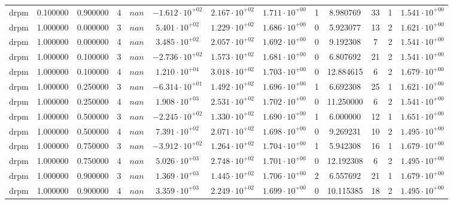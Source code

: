 \begin{table}
\begin{tabular}{ccccccccccccc}
drpm & 0.100000 & 0.900000 & 4 & $nan$ & $-1.612 \cdot 10^{+02}$ & $2.167 \cdot 10^{+02}$ & $1.711 \cdot 10^{+00}$ & 1 & 8.980769 & 33 & 1 & $1.541 \cdot 10^{+00}$ \\
drpm & 1.000000 & 0.000000 & 3 & $nan$ & $5.401 \cdot 10^{+02}$ & $1.229 \cdot 10^{+02}$ & $1.686 \cdot 10^{+00}$ & 0 & 5.923077 & 13 & 2 & $1.621 \cdot 10^{+00}$ \\
drpm & 1.000000 & 0.000000 & 4 & $nan$ & $3.485 \cdot 10^{+02}$ & $2.057 \cdot 10^{+02}$ & $1.692 \cdot 10^{+00}$ & 0 & 9.192308 & 7 & 2 & $1.541 \cdot 10^{+00}$ \\
drpm & 1.000000 & 0.100000 & 3 & $nan$ & $-2.736 \cdot 10^{+02}$ & $1.573 \cdot 10^{+02}$ & $1.681 \cdot 10^{+00}$ & 0 & 6.807692 & 21 & 2 & $1.541 \cdot 10^{+00}$ \\
drpm & 1.000000 & 0.100000 & 4 & $nan$ & $1.210 \cdot 10^{+04}$ & $3.018 \cdot 10^{+02}$ & $1.703 \cdot 10^{+00}$ & 0 & 12.884615 & 6 & 2 & $1.679 \cdot 10^{+00}$ \\
drpm & 1.000000 & 0.250000 & 3 & $nan$ & $-6.314 \cdot 10^{+01}$ & $1.492 \cdot 10^{+02}$ & $1.696 \cdot 10^{+00}$ & 1 & 6.692308 & 25 & 1 & $1.621 \cdot 10^{+00}$ \\
drpm & 1.000000 & 0.250000 & 4 & $nan$ & $1.908 \cdot 10^{+03}$ & $2.531 \cdot 10^{+02}$ & $1.702 \cdot 10^{+00}$ & 0 & 11.250000 & 6 & 2 & $1.541 \cdot 10^{+00}$ \\
drpm & 1.000000 & 0.500000 & 3 & $nan$ & $-2.245 \cdot 10^{+02}$ & $1.330 \cdot 10^{+02}$ & $1.690 \cdot 10^{+00}$ & 1 & 6.000000 & 12 & 1 & $1.651 \cdot 10^{+00}$ \\
drpm & 1.000000 & 0.500000 & 4 & $nan$ & $7.391 \cdot 10^{+02}$ & $2.071 \cdot 10^{+02}$ & $1.698 \cdot 10^{+00}$ & 0 & 9.269231 & 10 & 2 & $1.495 \cdot 10^{+00}$ \\
drpm & 1.000000 & 0.750000 & 3 & $nan$ & $-3.912 \cdot 10^{+02}$ & $1.264 \cdot 10^{+02}$ & $1.704 \cdot 10^{+00}$ & 1 & 5.942308 & 16 & 1 & $1.679 \cdot 10^{+00}$ \\
drpm & 1.000000 & 0.750000 & 4 & $nan$ & $5.026 \cdot 10^{+03}$ & $2.748 \cdot 10^{+02}$ & $1.701 \cdot 10^{+00}$ & 0 & 12.192308 & 6 & 2 & $1.495 \cdot 10^{+00}$ \\
drpm & 1.000000 & 0.900000 & 3 & $nan$ & $1.369 \cdot 10^{+03}$ & $1.445 \cdot 10^{+02}$ & $1.706 \cdot 10^{+00}$ & 2 & 6.557692 & 21 & 1 & $1.679 \cdot 10^{+00}$ \\
drpm & 1.000000 & 0.900000 & 4 & $nan$ & $3.359 \cdot 10^{+03}$ & $2.249 \cdot 10^{+02}$ & $1.699 \cdot 10^{+00}$ & 0 & 10.115385 & 18 & 2 & $1.495 \cdot 10^{+00}$ \\

\end{tabular}
\end{table}
